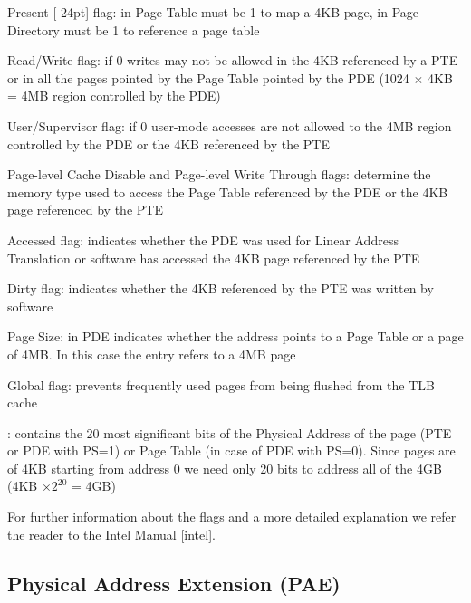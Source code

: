 \documentclass[twoside]{article}
\renewcommand{\cite}[1]{[#1]}
\begin{document}
\begin{description}
  \itemsep-3pt
  \item [P] Present \marginnote{(\cite{bovet_cesati_2006} pp. 48, \cite{intel} pp. 114-115)}[-24pt] flag: in Page Table must be 1 to map a 4KB page, in Page Directory must be 1 to reference a page table
  \item [R/W]  Read/Write flag: if 0 writes may not be allowed in the 4KB referenced by a PTE or in all the pages pointed by the Page Table pointed by the PDE (1024 $\times$ 4KB = 4MB region controlled by the PDE)
  \item [U/S] User/Supervisor flag: if 0 user-mode accesses are not allowed to the 4MB region controlled by the PDE or the 4KB referenced by the PTE
  \item [PCD and PWT] Page-level Cache Disable and Page-level Write Through flags: determine the memory type used to access the Page Table referenced by the PDE or the 4KB page referenced by the PTE
  \item[A]  Accessed flag: indicates whether the PDE was used for Linear Address Translation or software has accessed the 4KB page referenced by the PTE
  \item[D] Dirty flag: indicates whether the 4KB referenced by the PTE was written by software
  \item[PS] Page Size: in PDE indicates whether the address points to a Page Table or a page of 4MB.  In this case the entry refers to a 4MB page
  \item[G] Global flag: prevents frequently used pages from being flushed from the TLB cache
  \item[Address]: contains the 20 most significant bits of the Physical Address of the page (PTE or PDE with PS=1) or Page Table (in case of PDE with PS=0). Since pages are of 4KB starting from address 0 we need only 20 bits to address all of the 4GB (4KB $\times 2^{20}$ = 4GB)
\end{description}

For further information about the flags and a more detailed explanation we refer the reader to the Intel Manual \cite{intel}.

\subsection{Physical Address Extension (PAE)}
\end{document}
